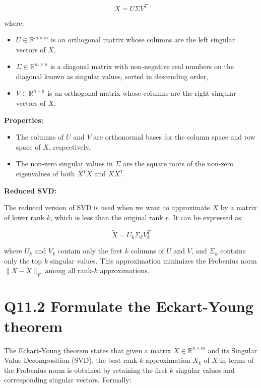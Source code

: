 \documentclass[11pt]{article}
\begin{document}
\[
X = U\Sigma V^T
\]

where:

\begin{itemize}
  \item \( U \in \mathbb{R}^{m \times m} \) is an orthogonal matrix whose columns are the left singular vectors of \( X \),
  \item \( \Sigma \in \mathbb{R}^{m \times n} \) is a diagonal matrix with non-negative real numbers on the diagonal known as singular values, sorted in descending order,
  \item \( V \in \mathbb{R}^{n \times n} \) is an orthogonal matrix whose columns are the right singular vectors of \( X \).
\end{itemize}

\textbf{Properties:}

\begin{itemize}
  \item The columns of \( U \) and \( V \) are orthonormal bases for the column space and row space of \( X \), respectively.
  \item The non-zero singular values in \( \Sigma \) are the square roots of the non-zero eigenvalues of both \( X^TX \) and \( XX^T \).
\end{itemize}

\textbf{Reduced SVD:}

The reduced version of SVD is used when we want to approximate \( X \) by a matrix of lower rank \( k \), which is less than the original rank \( r \). It can be expressed as:

\[
\tilde{X} = U_k \Sigma_k V_k^T
\]

where \( U_k \) and \( V_k \) contain only the first \( k \) columns of \( U \) and \( V \), and \( \Sigma_k \) contains only the top \( k \) singular values. This approximation minimizes the Frobenius norm \( \|X - \tilde{X}\|_F \) among all rank-\( k \) approximations.

\section{Q11.2 Formulate the Eckart-Young theorem}

The Eckart-Young theorem states that given a matrix \( X \in \mathbb{R}^{n \times m} \) and its Singular Value Decomposition (SVD), the best rank-\( k \) approximation \( X_k \) of \( X \) in terms of the Frobenius norm is obtained by retaining the first \( k \) singular values and corresponding singular vectors. Formally:
\end{document}
